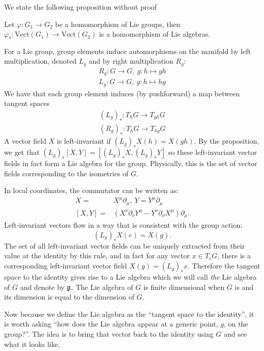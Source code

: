 		We state the following proposition without proof
		\begin{prop}
			Let $\varphi: G_1 \rightarrow G_2$ be a homomorphism of Lie groups, then $\varphi_*: \mathrm{Vect}(G_1) \rightarrow \mathrm{Vect}(G_2)$ is a homomorphism of Lie algebras. 
		\end{prop}
		
		For a Lie group, group elements induce automorphisms on the manifold by left multiplication, denoted $L_g$ and by right multiplication $R_g$:
		\[
			\begin{aligned}
				R_g: G \rightarrow G, ~ g: h \mapsto gh\\
				L_g: G \rightarrow G, ~ g: h \mapsto hg
			\end{aligned}
		\]
		 We have that each group element induces (by pushforward) a map between tangent spaces 
		\[
		 	\begin{aligned}
		 		(L_g)_*: T_h G \rightarrow T_{gh} G\\
				(R_g)_*: T_h G \rightarrow T_{hg} G
		 	\end{aligned}
		\]
		A vector field $X$ is left-invariant if $(L_g)_* X(h) = X(gh)$. 
		By the proposition, we get that $(L_g)_* [X, Y] = [(L_g)_* X, (L_g)_* Y]$ so these left-invariant vector fields in fact form a Lie algebra for the group. Physically, this is the set of vector fields corresponding to the isometries of $G$.
		
		In local coordinates, the commutator can be written as:
		\[
			\begin{aligned}
				X = &X^\mu \partial_\mu, ~ Y = Y^\mu \partial_\mu\\
				[X,Y] = &(X^\nu \partial_\nu Y^\mu - Y^\nu \partial_\nu X^\mu) \partial_\mu.
			\end{aligned}
		\]
		Left-invariant vectors flow in a way that is consistent with the group action:
		\[
			(L_g)_* X(e) = X(g).
		\]
		The set of all left-invariant vector fields can be uniquely extracted from their value at the identity by this rule, and in fact for any vector $x \in T_e G$, there is a corresponding left-invariant vector field $X(g) = (L_g)_* x$. Therefore the tangent space to the identity gives rise to a Lie algebra which we will call \emph{the} Lie algebra of $G$ and denote by $\frak g$. The Lie algebra of $G$ is finite dimensional when $G$ is and its dimension is equal to the dimension of $G$.
		
		
		Now because we define the Lie algebra as the ``tangent space to the identity'', it is worth asking ``how does the Lie algebra appear at a generic point, $g$, on the group?''. The idea is to bring that vector back to the identity using $G$ and see what it looks like. 
		
